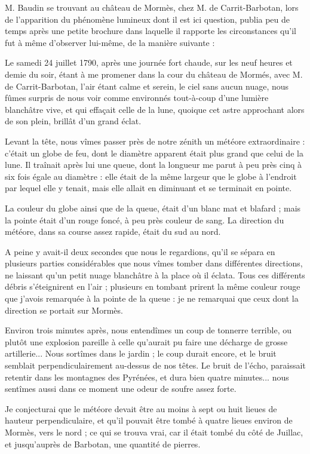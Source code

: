 \documentclass[a4paper, 12pt, oneside, french]{article}
\begin{document}
M. Baudin se trouvant au château de Mormès, chez M. de Carrit-Barbotan, lors de l'apparition du phénomène lumineux dont il est ici question, publia peu de temps après une petite brochure dans laquelle il rapporte les circonstances qu'il fut à même d'observer lui-même, de la manière suivante :

\og Le samedi 24 juillet 1790, après une journée fort chaude, sur les neuf heures et demie du soir, étant à me promener dans la cour du château de Mormés, avec M. de Carrit-Barbotan, l'air étant calme et serein, le ciel sans aucun nuage, nous fûmes surpris de nous voir comme environnés tout-à-coup d'une lumière blanchâtre vive, et qui effaçait celle de la lune, quoique cet astre approchant alors de son plein, brillât d'un grand éclat. \fg

\og Levant la tête, nous vîmes passer près de notre zénith un météore extraordinaire : c'était un globe de feu, dont le diamètre apparent était plus grand que celui de la lune. Il traînait après lui une queue, dont la longueur me parut à peu près cinq à six fois égale au diamètre : elle était de la même largeur que le globe à l'endroit par lequel elle y tenait, mais elle allait en diminuant et se terminait en pointe. \fg

\og La couleur du globe ainsi que de la queue, était d'un blanc mat et blafard ; mais la pointe était d'un rouge foncé, à peu près couleur de sang. La direction du météore, dans sa course assez rapide, était du sud au nord. \fg

\og A peine y avait-il deux secondes que nous le regardions, qu'il se sépara en plusieurs parties considérables que nous vîmes tomber dans différentes directions, ne laissant qu'un petit nuage blanchâtre à la place où il éclata. Tous ces différents débris s'éteignirent en l'air ; plusieurs en tombant prirent la même couleur rouge que j'avois remarquée à la pointe de la queue : je ne remarquai que ceux dont la direction se portait sur Mormès. \fg

\og Environ trois minutes après, nous entendîmes un coup de tonnerre terrible, ou plutôt une explosion pareille à celle qu'aurait pu faire une décharge de grosse artillerie... Nous sortîmes dans le jardin ; le coup durait encore, et le bruit semblait perpendiculairement au-dessus de nos têtes. Le bruit de l'écho, paraissait retentir dans les montagnes des Pyrénées, et dura bien quatre minutes... nous sentîmes aussi dans ce moment une odeur de soufre assez forte. \fg

\og Je conjecturai que le météore devait être au moins à sept ou huit lieues de hauteur perpendiculaire, et qu'il pouvait être tombé à quatre lieues environ de Mormès, vers le nord ; ce qui se trouva vrai, car il était tombé du côté de Juillac, et jusqu'auprès de Barbotan, une quantité de pierres. \fg
\end{document}

